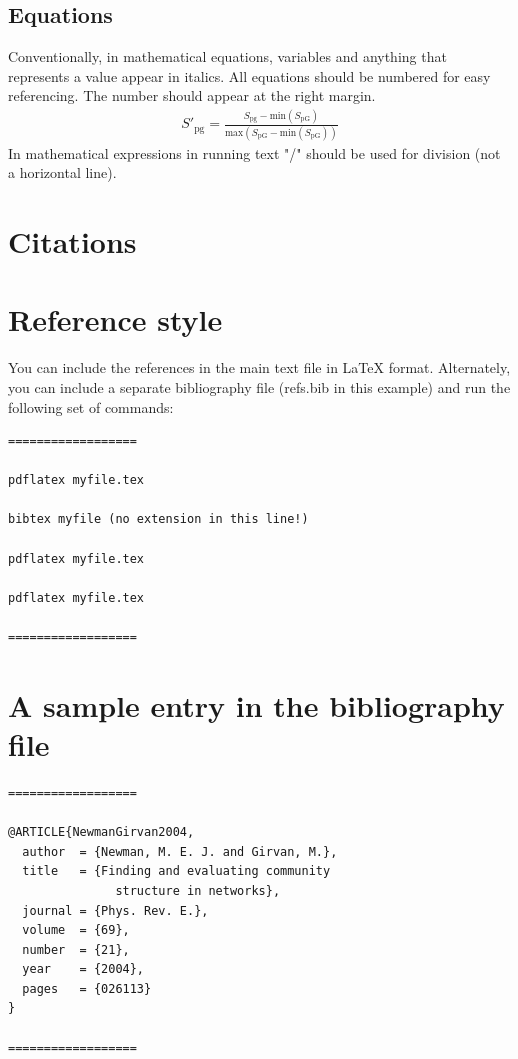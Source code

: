 \documentclass[times,twocolumn,final,authoryear]{elsarticle}
\begin{document}
\subsection{Equations}
Conventionally, in mathematical equations, variables and
anything that represents a value appear in italics. 
All equations should be numbered for easy referencing. 
The number should appear at the right margin.
\begin{eqnarray}
S'_{\mathrm{pg}} = \frac{S_{\mathrm{pg}} - \mathrm{min}(S_{\mathrm{pG}})}
  {\mathrm{max}(S_{\mathrm{pG}} - \mathrm{min}(S_{\mathrm{pG}}))}
\end{eqnarray}
In mathematical expressions 
in running text "/" should be used
for division (not a horizontal line).

\section{Citations}


\section{Reference style}
You can include the references in the main text file in \LaTeX
format. Alternately, you can include a separate bibliography
file (refs.bib in this example) and run the following set of 
commands:
\begin{verbatim}
==================

pdflatex myfile.tex

bibtex myfile (no extension in this line!)

pdflatex myfile.tex

pdflatex myfile.tex

==================
\end{verbatim}

\section{A sample entry in the bibliography file}
\begin{verbatim}
==================

@ARTICLE{NewmanGirvan2004,
  author  = {Newman, M. E. J. and Girvan, M.},
  title   = {Finding and evaluating community 
               structure in networks},
  journal = {Phys. Rev. E.},
  volume  = {69},
  number  = {21},
  year    = {2004},
  pages   = {026113}
}

==================
\end{verbatim}
\end{document}
